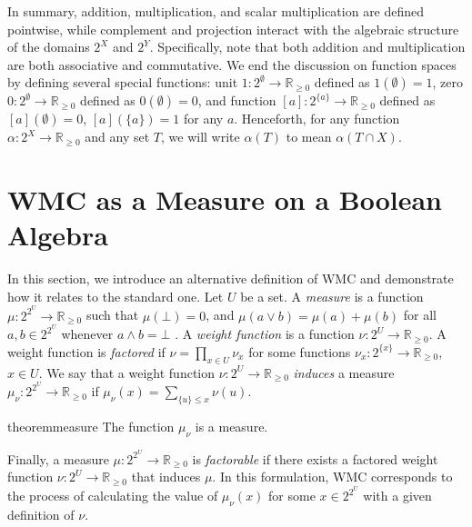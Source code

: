 \documentclass{uai2021} %
\theoremstyle{definition}
\begin{document}
In summary, addition, multiplication, and scalar multiplication are defined
pointwise, while complement and projection interact with the algebraic structure
of the domains $2^X$ and $2^Y$. Specifically, note that both addition and
multiplication are both associative and commutative. We end the discussion on
function spaces by defining several special functions: unit $1\colon 2^\emptyset
\to \mathbb{R}_{\ge 0}$ defined as $1(\emptyset) = 1$, zero $0\colon 2^\emptyset
\to \mathbb{R}_{\ge 0}$ defined as $0(\emptyset) = 0$, and function $[a]\colon
2^{\{a\}} \to \mathbb{R}_{\ge 0}$ defined as $[a](\emptyset) = 0$, $[a](\{a\}) =
1$ for any $a$. Henceforth, for any function $\alpha\colon 2^X \to
\mathbb{R}_{\ge 0}$ and any set $T$, we will write $\alpha(T)$ to mean $\alpha(T
\cap X)$.

\section{WMC as a Measure on a Boolean Algebra} \label{sec:wmc_as_measure}

In this section, we introduce an alternative definition of WMC and demonstrate
how it relates to the standard one. Let $U$ be a set. A \emph{measure} is a
function $\mu\colon 2^{2^U} \to \mathbb{R}_{\ge 0}$ such that $\mu(\bot) = 0$,
and $\mu(a \lor b) = \mu(a) + \mu(b)$ for all $a, b \in 2^{2^U}$ whenever $a
\land b = \bot$ \citep{gaifman1964concerning,DBLP:books/daglib/0090259}. A
\emph{weight function} is a function $\nu\colon 2^U \to \mathbb{R}_{\ge 0}$. A
weight function is \emph{factored} if $\nu = \prod_{x \in U} \nu_x$ for some
functions $\nu_x\colon 2^{\{x\}} \to \mathbb{R}_{\ge 0}$, $x \in U$. We say that
a weight function $\nu\colon 2^U \to \mathbb{R}_{\ge 0}$ \emph{induces} a
measure $\mu_\nu\colon 2^{2^U} \to \mathbb{R}_{\ge 0}$ if $\mu_\nu(x) =
\sum_{\{u\} \le x} \nu(u)$.

\begin{restatable}{theorem}{measure} \label{prop:measure}
  The function $\mu_\nu$ is a measure.
\end{restatable}

Finally, a measure $\mu\colon 2^{2^U} \to \mathbb{R}_{\ge 0}$ is
\emph{factorable} if there exists a factored weight function $\nu\colon 2^U \to
\mathbb{R}_{\ge 0}$ that induces $\mu$. In this formulation, WMC corresponds to
the process of calculating the value of $\mu_\nu(x)$ for some $x \in 2^{2^U}$
with a given definition of $\nu$.
\end{document}
